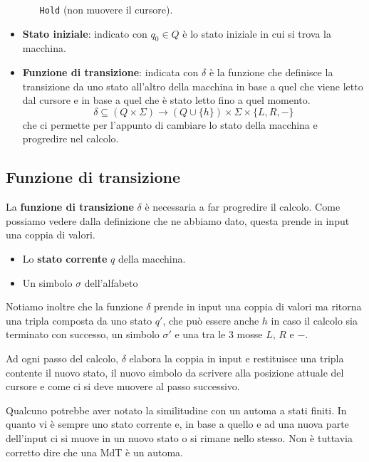 \begin{definition}
\begin{itemize}
\begin{itemize}
			            \verb|Hold| (non muovere il cursore).
		      \end{itemize}
		\item \textbf{Stato iniziale}: indicato con $q_0 \in Q$
		      è lo stato iniziale in cui si trova la macchina.
		\item \textbf{Funzione di transizione}: indicata con
		      $\delta$ è la funzione che definisce la
		      transizione da uno stato all'altro della macchina
		      in base a quel che viene letto dal cursore e in
		      base a quel che è stato letto fino a quel momento.
		      \[
			      \delta \subseteq (Q \times \Sigma) \to
			      (Q \cup \{ h \}) \times \Sigma \times
			      \{ L, R, - \}
		      \]
		      che ci permette per l'appunto di cambiare lo
		      stato della macchina e progredire nel calcolo.
	\end{itemize}
\end{definition}

\subsection{Funzione di transizione}
La \textbf{funzione di transizione} $\delta$ è necessaria a
far progredire il calcolo. Come possiamo vedere dalla
definizione che ne abbiamo dato, questa prende in input una
coppia di valori.
\begin{itemize}
	\item Lo \textbf{stato corrente} $q$ della macchina.
	\item Un simbolo $\sigma$ dell'alfabeto
\end{itemize}

Notiamo inoltre che la funzione $\delta$ prende in input una
coppia di valori ma ritorna una tripla composta da uno stato
$q'$, che può essere anche $h$ in caso il calcolo sia terminato
con successo, un simbolo $\sigma'$ e una tra le 3 mosse $L$,
$R$ e $-$.

Ad ogni passo del calcolo, $\delta$ elabora la coppia in input
e restituisce una tripla contente il nuovo stato, il nuovo
simbolo da scrivere alla posizione attuale del cursore e come
ci si deve muovere al passo successivo.

Qualcuno potrebbe aver notato la similitudine con un automa a
stati finiti. In quanto vi è sempre uno stato corrente e, in
base a quello e ad una nuova parte dell'input ci si muove in
un nuovo stato o si rimane nello stesso. Non è tuttavia
corretto dire che una MdT è un automa.

